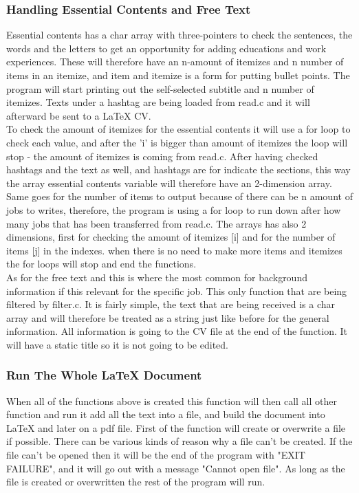 \subsubsection{Handling Essential Contents and Free Text}
Essential contents has a char array with three-pointers to check the sentences,
the words and the letters to get an opportunity for adding educations and work experiences.
These will therefore have an n-amount of itemizes and n number of items in an itemize, 
and item and itemize is a form for putting bullet points.
The program will start printing out the self-selected subtitle and n number of itemizes.
Texts under a hashtag are being loaded from read.c and it will afterward be sent to a LaTeX CV.\\
 
To check the amount of itemizes for the essential contents it will use a for loop to check each value,
and after the 'i' is bigger than amount of itemizes the loop will stop - the amount of itemizes is coming from read.c.
After having checked hashtags and the text as well, and hashtags are for indicate the sections,
this way the array essential contents variable will therefore have an 2-dimension array.
Same goes for the number of items to output because of there can be n amount of jobs to writes, 
therefore, the program is using a for loop to run down after how many jobs that has been transferred from read.c.
The arrays has also 2 dimensions, first for checking the amount of itemizes [i] and for the number of items [j] in the indexes.
when there is no need to make more items and itemizes the for loops will stop and end the functions. \\

As for the free text and this is where the most common for background information if this relevant for the specific job.
This only function that are being filtered by filter.c. It is fairly simple, 
the text that are being received is a char array and will therefore be treated as a string 
just like before for the general information. All information is going to the CV file at the end of the function.
It will have a static title so it is not going to be edited.

\subsubsection{Run The Whole LaTeX Document}
When all of the functions above is created this function will then call all other function and run it add all the text into a file,
and build the document into LaTeX and later on a pdf file.
First of the function will create or overwrite a file if possible. There can be various kinds of reason why a file can't be created.
If the file can't be opened then it will be the end of the program with "EXIT FAILURE", 
and it will go out with a message "Cannot open file".
As long as the file is created or overwritten the rest of the program will run.\\


